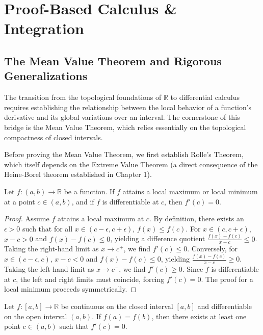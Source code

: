 \section{Proof-Based Calculus \& Integration}

\subsection{The Mean Value Theorem and Rigorous Generalizations}

The transition from the topological foundations of $\mathbb{R}$ to differential calculus requires establishing the relationship between the local behavior of a function's derivative and its global variations over an interval. The cornerstone of this bridge is the Mean Value Theorem, which relies essentially on the topological compactness of closed intervals. 

Before proving the Mean Value Theorem, we first establish Rolle's Theorem, which itself depends on the Extreme Value Theorem (a direct consequence of the Heine-Borel theorem established in Chapter 1).

\begin{lemma}
Let $f: (a, b) \to \mathbb{R}$ be a function. If $f$ attains a local maximum or local minimum at a point $c \in (a, b)$, and if $f$ is differentiable at $c$, then $f'(c) = 0$.
\end{lemma}

\begin{proof}
Assume $f$ attains a local maximum at $c$. By definition, there exists an $\epsilon > 0$ such that for all $x \in (c - \epsilon, c + \epsilon)$, $f(x) \le f(c)$. 
For $x \in (c, c + \epsilon)$, $x - c > 0$ and $f(x) - f(c) \le 0$, yielding a difference quotient $\frac{f(x) - f(c)}{x - c} \le 0$. Taking the right-hand limit as $x \to c^+$, we find $f'(c) \le 0$.
Conversely, for $x \in (c - \epsilon, c)$, $x - c < 0$ and $f(x) - f(c) \le 0$, yielding $\frac{f(x) - f(c)}{x - c} \ge 0$. Taking the left-hand limit as $x \to c^-$, we find $f'(c) \ge 0$.
Since $f$ is differentiable at $c$, the left and right limits must coincide, forcing $f'(c) = 0$. The proof for a local minimum proceeds symmetrically.
\end{proof}

\begin{theorem}
Let $f: [a, b] \to \mathbb{R}$ be continuous on the closed interval $[a, b]$ and differentiable on the open interval $(a, b)$. If $f(a) = f(b)$, then there exists at least one point $c \in (a, b)$ such that $f'(c) = 0$.
\end{theorem}

